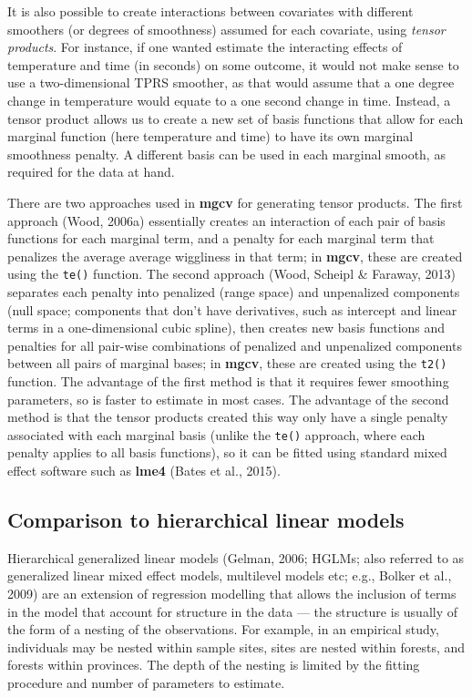 \documentclass[12pt]{article}
\begin{document}
It is also possible to create interactions between covariates with
different smoothers (or degrees of smoothness) assumed for each
covariate, using \emph{tensor products}. For instance, if one wanted
estimate the interacting effects of temperature and time (in seconds) on
some outcome, it would not make sense to use a two-dimensional TPRS
smoother, as that would assume that a one degree change in temperature
would equate to a one second change in time. Instead, a tensor product
allows us to create a new set of basis functions that allow for each
marginal function (here temperature and time) to have its own marginal
smoothness penalty. A different basis can be used in each marginal
smooth, as required for the data at hand.

There are two approaches used in \textbf{mgcv} for generating tensor
products. The first approach (Wood, 2006a) essentially creates an
interaction of each pair of basis functions for each marginal term, and
a penalty for each marginal term that penalizes the average average
wiggliness in that term; in \textbf{mgcv}, these are created using the
\texttt{te()} function. The second approach (Wood, Scheipl \& Faraway,
2013) separates each penalty into penalized (range space) and
unpenalized components (null space; components that don't have
derivatives, such as intercept and linear terms in a one-dimensional
cubic spline), then creates new basis functions and penalties for all
pair-wise combinations of penalized and unpenalized components between
all pairs of marginal bases; in \textbf{mgcv}, these are created using
the \texttt{t2()} function. The advantage of the first method is that it
requires fewer smoothing parameters, so is faster to estimate in most
cases. The advantage of the second method is that the tensor products
created this way only have a single penalty associated with each
marginal basis (unlike the \texttt{te()} approach, where each penalty
applies to all basis functions), so it can be fitted using standard
mixed effect software such as \textbf{lme4} (Bates et al., 2015).

\subsection{Comparison to hierarchical linear
models}\label{comparison-to-hierarchical-linear-models}

Hierarchical generalized linear models (Gelman, 2006; HGLMs; also
referred to as generalized linear mixed effect models, multilevel models
etc; e.g., Bolker et al., 2009) are an extension of regression modelling
that allows the inclusion of terms in the model that account for
structure in the data --- the structure is usually of the form of a
nesting of the observations. For example, in an empirical study,
individuals may be nested within sample sites, sites are nested within
forests, and forests within provinces. The depth of the nesting is
limited by the fitting procedure and number of parameters to estimate.
\end{document}
